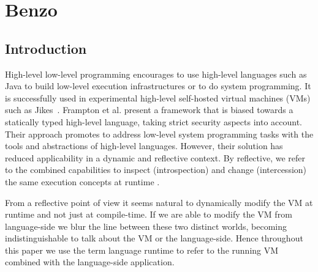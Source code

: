 

\chapter{Benzo}
\minitoc


\section{Introduction}
High-level low-level programming \cite{Fram09a} encourages to use high-level languages such as Java to build low-level execution infrastructures or to do system programming. 
It is successfully used in experimental high-level self-hosted virtual machines (VMs) such as Jikes~\cite{Alpe99a}.  
Frampton et al. present a framework that is biased towards a statically typed high-level language, taking strict security aspects into account.
Their approach promotes to address low-level system programming tasks with the tools and abstractions of high-level languages.
However, their solution has reduced applicability in a dynamic and reflective context.
By reflective, we refer to the combined capabilities to inspect (introspection) and change (intercession) the same execution concepts at runtime \cite{Maes87a}.

From a reflective point of view it seems natural to dynamically modify the VM at runtime and not just at compile-time.
If we are able to modify the VM from language-side we blur the line between these two distinct worlds, becoming indistinguishable to talk about the VM or the language-side.
Hence throughout this paper we use the term language runtime to refer to the running VM combined with the language-side application.



